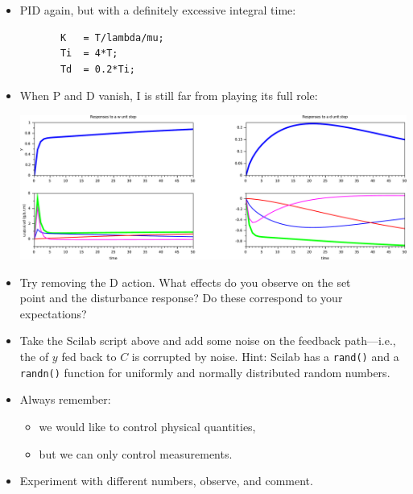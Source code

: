 \begin{frame}[fragile]
\myPause
 \begin{itemize}[<+-| alert@+>]
 \item PID again, but with a definitely excessive integral time:
       {\scriptsize
       \begin{verbatim}
       K   = T/lambda/mu;
       Ti  = 4*T;
       Td  = 0.2*Ti;
       \end{verbatim}
       }
 \item \vspace{-3mm}When P and D vanish, I is still far from playing its full role:
       \begin{center}
        \includegraphics[width=0.60\columnwidth]{./Unit-07/img/PIDactions-scilab-04.pdf}
       \end{center}
 \item Try removing the D action. What effects do you observe on the set\\ 
       point and the disturbance response? Do these correspond to your\\
       expectations?
 \end{itemize}
\end{frame}

\begin{frame}[fragile]
\myPause
 \begin{itemize}[<+-| alert@+>]
 \item Take the Scilab script above and add some noise on the feedback path---i.e., the 
       of $y$ fed back to $C$ is corrupted by noise. Hint: Scilab has a \texttt{rand()} and a \texttt{randn()}
       function for uniformly and normally distributed random numbers.
 \item Always remember:
       \begin{itemize}[<+-| alert@+>]
       \item we would like to control physical quantities,
       \item but we can only control measurements.
       \end{itemize}
 \item \vfill Experiment with different numbers, observe, and comment.
 \end{itemize}
\end{frame}


